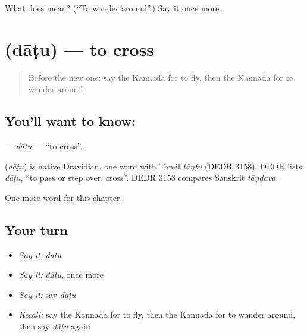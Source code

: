 \begin{tcolorbox}[breakable,colback=teal!4,colframe=teal!35!black,title={Before you move on}]
What does  mean? (\textquotedblleft{}To wander around\textquotedblright{}.) Say it once more.
\end{tcolorbox}
\section[\texorpdfstring{\kn{ದಾಟು} (dāṭu)}{ದಾಟು (dāṭu)}]{ (dāṭu) — to cross}

\label{lesson:KA-C273-datu}



\begin{quote}
Before the new one: say the Kannada for to fly, then the Kannada for to wander around.
\end{quote}

\subsection*{You'll want to know: }
\textbf{} — \emph{dāṭu} — \textquotedblleft{}to cross\textquotedblright{}.

\begin{cousinweb}
\textbf{} (\emph{dāṭu}) is native Dravidian, one word with Tamil \emph{tāṇṭu} (DEDR 3158). DEDR lists \emph{dāṭu}, \textquotedblleft{}to pass or step over, cross\textquotedblright{}. DEDR 3158 compares Sanskrit \emph{tāṇḍava}.
\end{cousinweb}

\begin{grammarlens}[title={What you've built}]
One more word for this chapter.
\end{grammarlens}

\subsection*{Your turn}
\begin{itemize}
\raggedright
  \item \emph{Say it:} \emph{dāṭu}
  \item \emph{Say it:} \emph{dāṭu}, once more
  \item \emph{Say it:} say \emph{dāṭu}
  \item \emph{Recall:} say the Kannada for to fly, then the Kannada for to wander around, then say \emph{dāṭu} again
\end{itemize}

